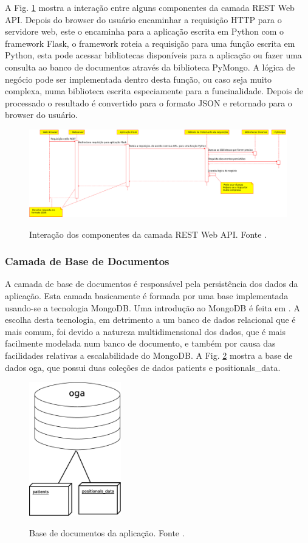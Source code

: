 \documentclass[journal]{IEEEtran}
\begin{document}
A Fig. \ref{camada_api} mostra a interação entre alguns componentes da camada REST Web API.
Depois do browser do usuário encaminhar a requisição HTTP para o servidore web, este o 
encaminha para a aplicação escrita em Python com o framework Flask, o framework roteia
a requisição para uma função escrita em Python, esta pode acessar bibliotecas disponíveis
para a aplicação ou fazer uma consulta ao banco de documentos através da biblioteca PyMongo.
A lógica de negócio pode ser implementada dentro desta função, ou caso seja muito complexa,
numa biblioteca escrita especiamente para a funcinalidade.
Depois de processado o resultado é convertido para o formato JSON e retornado para o browser
do usuário.

\begin{figure}[tb]
	\centering
	{\includegraphics[width=\textwidth]{camada_api}}
	\caption{Interação dos componentes da camada REST Web API. Fonte \cite{Lima2015}.}
	\label{camada_api}
\end{figure}

\subsubsection{Camada de Base de Documentos}

A camada de base de documentos é responsável pela persistência dos dados da aplicação.
Esta camada basicamente é formada por uma base implementada usando-se a tecnologia
MongoDB. Uma introdução ao MongoDB é feita em \cite{Plugge2014}.
A escolha desta tecnologia, em detrimento a um banco de dados relacional que é mais comum,
foi devido a natureza multidimensional dos dados, que é mais facilmente modelada num
banco de documento, e também por causa das facilidades relativas a escalabilidade do 
MongoDB.
A Fig. \ref{mongo_oga} mostra a base de dados oga, que possui duas coleções de dados 
patients e positionals\_data.

\begin{figure}[!t]
	\centering
	{\includegraphics[width=4cm]{mongo_oga}}
	\caption{Base de documentos da aplicação. Fonte \cite{Lima2015}.}
	\label{mongo_oga}
\end{figure}
\end{document}
